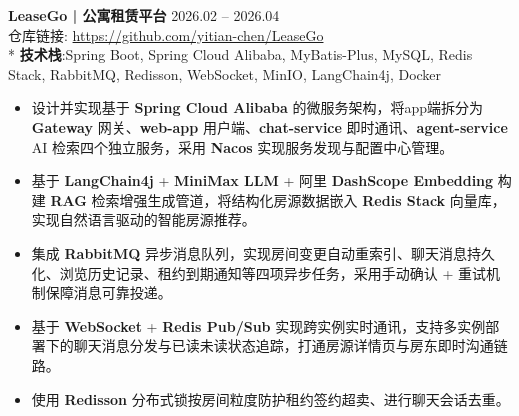 \documentclass[10pt]{article}
\newlength{\interProjectSpacing}
\newcommand{\projectsep}{\vspace{\interProjectSpacing}}
\newlength{\intraProjectTitleSep}
\newcommand{\titlebreak}{\\[\intraProjectTitleSep]}
\newlength{\intraProjectListTopSep}
\begin{document}
\textbf{LeaseGo | 公寓租赁平台} \hfill 2026.02 -- 2026.04 \titlebreak
{\small 仓库链接: \color{CVBlue} \href{https://github.com/yitian-chen/LeaseGo}{https://github.com/yitian-chen/LeaseGo}}\\*
\textbf{技术栈}:Spring Boot, Spring Cloud Alibaba, MyBatis-Plus, MySQL, Redis Stack, RabbitMQ, Redisson, WebSocket, MinIO, LangChain4j, Docker
\begin{itemize}[nosep, topsep=\intraProjectListTopSep]
    \item 设计并实现基于 \textbf{Spring Cloud Alibaba} 的微服务架构，将app端拆分为 \textbf{Gateway} 网关、\textbf{web-app} 用户端、\textbf{chat-service} 即时通讯、\textbf{agent-service} AI 检索四个独立服务，采用 \textbf{Nacos} 实现服务发现与配置中心管理。

    \item 基于 \textbf{LangChain4j} + \textbf{MiniMax LLM} + 阿里 \textbf{DashScope Embedding} 构建 \textbf{RAG} 检索增强生成管道，将结构化房源数据嵌入 \textbf{Redis Stack} 向量库，实现自然语言驱动的智能房源推荐。

    \item 集成 \textbf{RabbitMQ} 异步消息队列，实现房间变更自动重索引、聊天消息持久化、浏览历史记录、租约到期通知等四项异步任务，采用手动确认 + 重试机制保障消息可靠投递。

    \item 基于 \textbf{WebSocket} + \textbf{Redis Pub/Sub} 实现跨实例实时通讯，支持多实例部署下的聊天消息分发与已读未读状态追踪，打通房源详情页与房东即时沟通链路。

    \item 使用 \textbf{Redisson} 分布式锁按房间粒度防护租约签约超卖、进行聊天会话去重。

\end{itemize}

\projectsep
\end{document}
